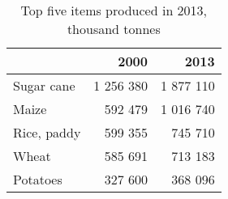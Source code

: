 \begin{table}
\centering
\caption{Top five items produced in 2013, thousand tonnes} 
{\footnotesize
\begin{tabular}{p{1.0cm}rr}
  \toprule
 & 2000 & 2013 \\ 
  \midrule
Sugar cane & 1 256 380 & 1 877 110 \\ 
  Maize &   592 479 & 1 016 740 \\ 
  Rice, paddy &   599 355 &   745 710 \\ 
  Wheat &   585 691 &   713 183 \\ 
  Potatoes &   327 600 &   368 096 \\ 
   \bottomrule
\end{tabular}
}
\end{table}
